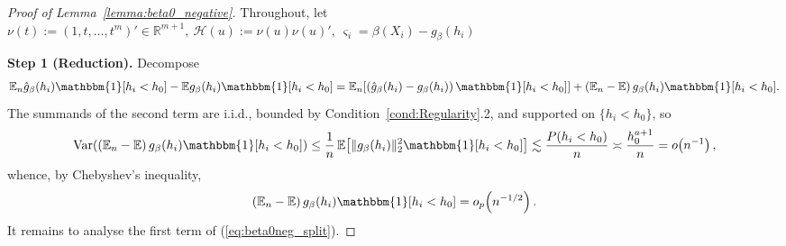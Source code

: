 \documentclass{article}
\newcommand{\normm}[1]{\lVert#1\rVert}
\newcommand{\E}{\mathbb{E}}
\newcommand{\R}{\mathbb{R}}
\newcommand{\I}{\mathbbm{1}}
\DeclareMathOperator{\Var}{Var}
\begin{document}
\begin{appendices}
\begin{proof}[Proof of Lemma~\ref{lemma:beta0_negative}]
    Throughout, let $\nu(t) := (1,t,\dots,t^m)' \in\R^{m+1},\ \mathcal{H}(u):=\nu(u)\nu(u)', \ \varsigma_i = \beta(X_i)-g_{\beta}(h_i)$

\textbf{Step 1 (Reduction).}
Decompose
\begin{align}\label{eq:beta0neg_split}
    \E_n \hat{g}_{\beta}(h_i)\I[h_i< h_0] - \E g_{\beta}(h_i)\I[h_i< h_0]
    = \E_n\!\left[\left(\hat{g}_{\beta}(h_i)-g_{\beta}(h_i)\right)\I[h_i< h_0]\right]
      + \left(\E_n-\E\right)g_{\beta}(h_i)\I[h_i< h_0].
\end{align}
The summands of the second term are i.i.d., bounded by
Condition~\ref{cond:Regularity}.2, and supported on $\{h_i<h_0\}$, so
\begin{align*}
    \Var\!\left(\left(\E_n-\E\right)g_{\beta}(h_i)\I[h_i<h_0]\right)
    \le \frac{1}{n}\,\E\!\left[\normm{g_\beta(h_i)}_2^2\I[h_i<h_0]\right]
    \lesssim \frac{P(h_i<h_0)}{n}\asymp \frac{h_0^{a+1}}{n}=o\!\left(n^{-1}\right),
\end{align*}
whence, by Chebyshev's inequality,
\begin{align}\label{eq:beta0neg_sampling}
    \left(\E_n-\E\right)g_{\beta}(h_i)\I[h_i< h_0]=o_p\!\left(n^{-1/2}\right).
\end{align}
It remains to analyse the first term of (\ref{eq:beta0neg_split}).
 


\end{proof}
\end{appendices}
\end{document}

